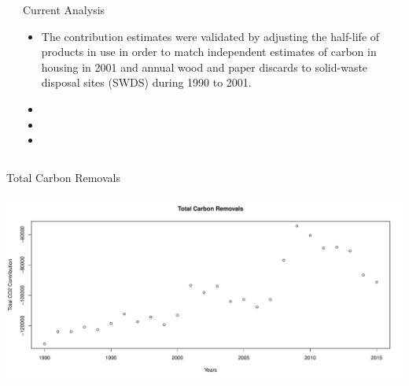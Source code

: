 \documentclass[final]{beamer}\usepackage[]{graphicx}\usepackage[]{color}
\makeatletter
\def\maxwidth{ %
  \ifdim\Gin@nat@width>\linewidth
    \linewidth
  \else
    \Gin@nat@width
  \fi
}
\newenvironment{knitrout}{}{} %
\newlength{\onecolwid}
\newlength{\twocolwid}
\makeatother
\begin{document}
\begin{frame}[t]
\begin{columns}[t]
\begin{column}{\twocolwid}
\begin{columns}[t,totalwidth=\twocolwid]
\begin{column}{\onecolwid}

\end{column} %

\begin{column}{\onecolwid}\vspace{-.6in} %


\begin{block}{Current Analysis}
\vspace{0ex}
\begin{itemize}
\item The contribution estimates were validated by adjusting the half-life of products in use in order to match independent estimates of carbon in housing in 2001 and annual wood and paper discards to solid-waste disposal sites (SWDS) during 1990 to 2001. 
\item
\item
\item
\end{itemize}
\end{block}


\end{column} %

\end{columns} %


\begin{alertblock}{Total Carbon Removals}
\vspace{0ex}
\centering
\begin{knitrout}
\color{fgcolor}

{\centering \includegraphics[width=\maxwidth]{figure/RCODE-1} 

}
\end{knitrout}
\end{alertblock}
\end{column}
\end{columns}
\end{frame}
\end{document}
